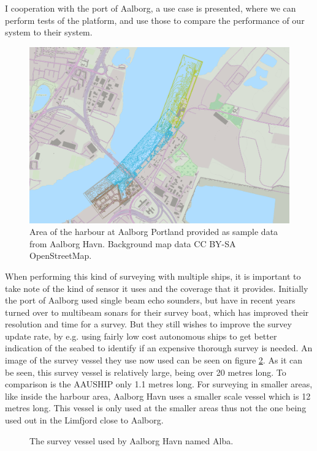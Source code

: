 I cooperation with the port of Aalborg, a use case is presented, where we can perform tests of the platform, and use those to compare the performance of our system to their system.
\begin{figure}[htbp]
	\centering
	\includegraphics[width=\textwidth]{fig/use-case-data}
	\caption{Area of the harbour at Aalborg Portland provided as sample
	data from Aalborg Havn. Background map data CC BY-SA OpenStreetMap.}
	\label{fig:diffforms}
\end{figure}

When performing this kind of surveying with multiple ships, it is important to take note of the kind of sensor it uses and the coverage that it provides. Initially the port of Aalborg used single beam echo sounders, but have in recent years turned over to multibeam sonars for their survey boat, which has improved their resolution and time for a survey. But they still wishes to improve the survey update rate, by e.g. using fairly low cost autonomous ships to get better indication of the seabed to identify if an expensive thorough survey is needed. An image of the survey vessel they use now used can be seen on figure \ref{fig:alba}. As it can be seen, this survey vessel is relatively large, being over 20 metres long. To comparison is the AAUSHIP only 1.1 metres long. For surveying in smaller areas, like inside the harbour area, Aalborg Havn uses a smaller scale vessel which is 12 metres long. This vessel is only used at the smaller areas thus not the one being used out in the Limfjord close to Aalborg.
\begin{figure}
	\centering
	
	\caption{The survey vessel used by Aalborg Havn named Alba.}
	\label{fig:alba}
\end{figure}



